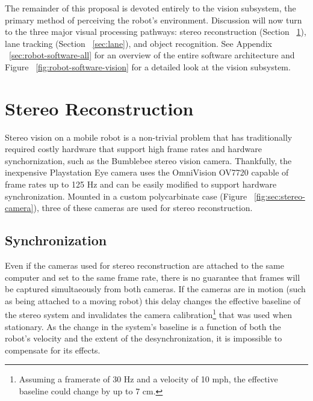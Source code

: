 \documentclass[11pt,twocolumn]{article}
\begin{document}
The remainder of this proposal is devoted entirely to the vision subsystem, the
primary method of perceiving the robot’s environment. Discussion will now turn
to the three major visual processing pathways: stereo reconstruction (Section
~\ref{sec:stereo}), lane tracking (Section ~\ref{sec:lane}), and object
recognition. See Appendix ~\ref{sec:robot-software-all} for an overview of the
entire software architecture and Figure ~\ref{fig:robot-software-vision} for a
detailed look at the vision subsystem.


\section{Stereo Reconstruction}
\label{sec:stereo}
Stereo vision on a mobile robot is a non-trivial problem that has traditionally
required costly hardware that support high frame rates and hardware
synchornization, such as the Bumblebee stereo vision camera. Thankfully, the
inexpensive Playstation Eye camera uses the OmniVision OV7720 capable of frame
rates up to 125 Hz and can be easily modified to support hardware
synchronization. Mounted in a custom polycarbinate case (Figure
~\ref{fig:sec:stereo-camera}), three of these cameras are used for stereo
reconstruction.

\subsection{Synchronization}
\label{sec:stereo-sync}
Even if the cameras used for stereo reconstruction are attached to the same
computer and set to the same frame rate, there is no guarantee that frames will
be captured simultaeously from both cameras. If the cameras are in motion (such
as being attached to a moving robot) this delay changes the effective baseline
of the stereo system and invalidates the camera calibration\footnote{Assuming a
framerate of 30 Hz and a velocity of 10 mph, the effective baseline could change
by up to 7 cm.} that was used when stationary. As the change in the system's
baseline is a function of both the robot's velocity and the extent of the
desynchronization, it is impossible to compensate for its effects.
\end{document}

